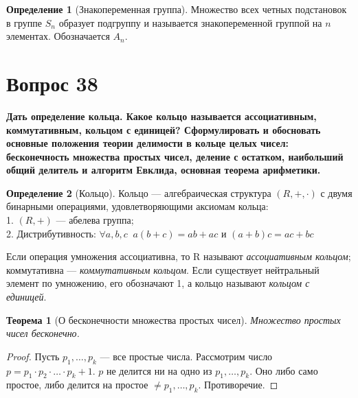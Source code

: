 \documentclass{article}
\theoremstyle{definition}
\newtheorem{definition}{Определение}
\theoremstyle{plain}
\newtheorem{theorem}{Теорема}
\begin{document}
\begin{definition}[Знакопеременная группа]
  Множество всех четных подстановок в группе $S_{n}$ образует подгруппу и называется знакопеременной группой на $n$ элементах.
  Обозначается $A_{n}$.
\end{definition}

\section{Вопрос 38}
\textbf{Дать определение кольца. Какое кольцо называется ассоциативным, коммутативным, кольцом с единицей?
Сформулировать и обосновать основные положения теории делимости в кольце целых чисел: бесконечность множества простых чисел, деление с остатком, наибольший общий делитель и алгоритм Евклида, основная теорема арифметики.}

\begin{definition}[Кольцо]
  Кольцо --- алгебраическая структура $(R,+,\cdot)$ с двумя бинарными операциями, удовлетворяющими аксиомам кольца:\\
  1. $(R, +)$ --- абелева группа;\\
  2. Дистрибутивность: $\forall a, b, c\ $ $a(b + c) = ab + ac$ и $(a + b)c = ac + bc$
\end{definition}
Если операция умножения ассоциативна, то R называют \emph{ассоциативным кольцом}; коммутативна --- \emph{коммутативным кольцом}.
Если существует нейтральный элемент по умножению, его обозначают 1, а кольцо называют \emph{кольцом с единицей}.

\begin{theorem}[О бесконечности множества простых чисел]
  Множество простых чисел бесконечно.
\end{theorem}
\begin{proof}
  Пусть $p_{1},\ldots,p_{k}$ --- все простые числа.
  Рассмотрим число $p = p_{1} \cdot p_{2} \cdot \ldots \cdot p_{k} + 1$.
  $p$ не делится ни на одно из $p_{1},\ldots,p_{k}$.
  Оно либо само простое, либо делится на простое $\neq p_{1},\ldots,p_{k}$. Противоречие.
\end{proof}
\end{document}
